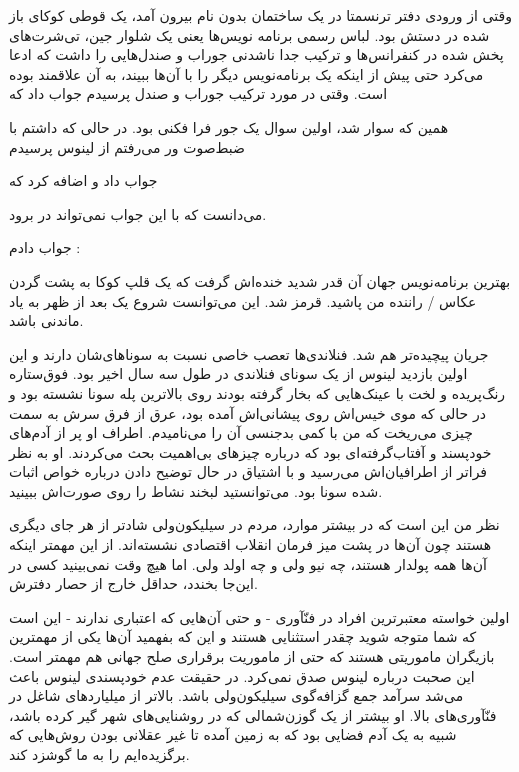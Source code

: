 \begin{journal}
وقتی از ورودی دفتر ترنسمتا در یک ساختمان بدون نام بیرون آمد، یک قوطی
کوکای باز شده در دستش بود. لباس رسمی برنامه‌ نویس‌ها یعنی یک شلوار جین،
تی‌شرت‌های پخش شده در کنفرانس‌ها و ترکیب جدا ناشدنی جوراب و صندل‌هایی را
داشت که ادعا می‌کرد حتی پیش از اینکه یک برنامه‌نویس دیگر را با آن‌ها
ببیند، به آن علاقمند بوده است. وقتی در مورد ترکیب جوراب و صندل پرسیدم
جواب داد که 

همین که سوار شد، اولین سوال یک جور فرا فکنی بود. در حالی که داشتم با
ضبط‌صوت ور می‌رفتم از لینوس پرسیدم 

جواب داد  و اضافه کرد که 

می‌دانست که با این جواب نمی‌تواند در برود.

جواب دادم : 

بهترین برنامه‌نویس جهان آن قدر شدید خنده‌اش گرفت که یک قلپ کوکا به پشت
گردن عکاس / راننده من پاشید. قرمز شد. این می‌توانست شروع یک بعد از ظهر
به یاد ماندنی باشد.

جریان پیچیده‌تر هم شد. فنلاندی‌ها تعصب خاصی نسبت به سوناهای‌شان دارند و
این اولین بازدید لینوس از یک سونای فنلاندی در طول سه سال اخیر
بود. فوق‌ستاره رنگ‌پریده و لخت با عینک‌هایی که بخار گرفته بودند روی
بالاترین پله سونا نشسته بود و در حالی که موی خیس‌اش روی پیشانی‌اش آمده
بود، عرق از فرق سرش به سمت چیزی می‌ریخت که من با کمی بدجنسی آن را
 می‌نامیدم. اطراف او پر از آد‌م‌های خودپسند و آفتاب‌گرفته‌ای بود که
درباره چیزهای بی‌اهمیت بحث می‌کردند. او به نظر فراتر از اطرافیان‌اش
می‌رسید و با اشتیاق در حال توضیح دادن درباره خواص اثبات شده سونا
بود. می‌توانستید لبخند نشاط را روی صورت‌اش ببینید.

نظر من این است که در بیشتر موارد، مردم در سیلیکون‌ولی شادتر از هر جای
دیگری هستند چون آن‌ها در پشت میز فرمان انقلاب اقتصادی نشسته‌اند. از این
مهمتر اینکه آن‌ها همه پولدار هستند، چه نیو ولی و چه اولد
ولی. اما هیچ وقت نمی‌بینید کسی در
این‌جا بخندد، حداقل خارج از حصار دفترش.

اولین خواسته معتبرترین افراد در فنّآوری - و حتی آن‌هایی که اعتباری
ندارند - این است که شما متوجه شوید چقدر استثنایی هستند و این که بفهمید
آن‌ها یکی از مهمترین بازیگران ماموریتی هستند که حتی از ماموریت برقراری
صلح جهانی هم مهمتر است. این صحبت درباره لینوس صدق نمی‌کرد. در حقیقت عدم
خودپسندی لینوس باعث می‌شد سرآمد جمع گزافه‌گوی سیلیکون‌ولی باشد. بالاتر از
میلیاردهای شاغل در فنّآوری‌های بالا. او بیشتر از یک گوزن‌شمالی که در
روشنایی‌های شهر گیر کرده باشد، شبیه به یک آدم فضایی بود که به زمین آمده
تا غیر عقلانی بودن روش‌هایی که برگزیده‌ایم را به ما گوشزد کند.


\end{journal}
